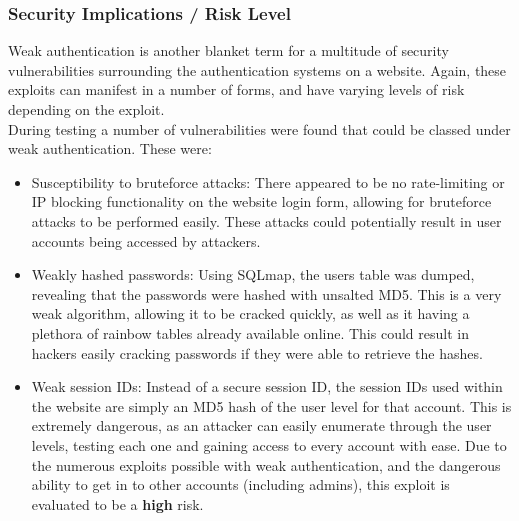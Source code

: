\documentclass{report}
\begin{document}
\subsubsection{Security Implications / Risk Level}
Weak authentication is another blanket term for a multitude of security vulnerabilities surrounding the authentication systems on a website. Again, these exploits can manifest in a number of forms, and have varying levels of risk depending on the exploit.\\
During testing a number of vulnerabilities were found that could be classed under weak authentication. These were:
\begin{itemize}
	\item Susceptibility to bruteforce attacks: There appeared to be no rate-limiting or IP blocking functionality on the website login form, allowing for bruteforce attacks to be performed easily. These attacks could potentially result in user accounts being accessed by attackers.
	\item Weakly hashed passwords: Using SQLmap, the users table was dumped, revealing that the passwords were hashed with unsalted MD5. This is a very weak algorithm, allowing it to be cracked quickly, as well as it having a plethora of rainbow tables already available online. This could result in hackers easily cracking passwords if they were able to retrieve the hashes.
	\item Weak session IDs: Instead of a secure session ID, the session IDs used within the website are simply an MD5 hash of the user level for that account. This is extremely dangerous, as an attacker can easily enumerate through the user levels, testing each one and gaining access to every account with ease.
Due to the numerous exploits possible with weak authentication, and the dangerous ability to get in to other accounts (including admins), this exploit is evaluated to be a \textbf{high} risk.
\end{itemize}
\end{document}
